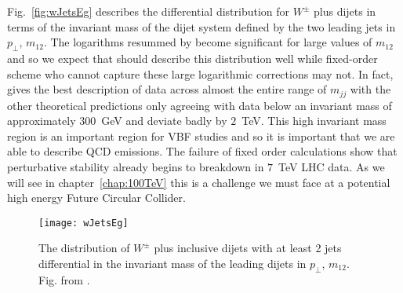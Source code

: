 		Fig.~\eqref{fig:wJetsEg} describes the differential distribution for $W^\pm$ plus dijets in terms of the
		invariant mass of the dijet system defined by the two leading jets in $p_\perp$, $m_{12}$.  The logarithms
		resummed by \hej become significant for large values of $m_{12}$ and so we expect that \HEJ should
		describe this distribution well while fixed-order scheme who cannot capture these large logarithmic
		corrections may not. In fact, \HEJ gives the best description of data across almost the entire range of $m_{jj}$
		with the other theoretical predictions only agreeing with data below an invariant mass of approximately $300$~GeV
		and deviate badly by $2$~TeV.  This high invariant mass region is an important region for VBF studies and so it
		is important that we are able to describe QCD emissions.  The failure of fixed order calculations show that
		perturbative stability already begins to breakdown in $7$~TeV LHC data.  As we will see in chapter~\ref{chap:100TeV}
		this is a challenge we must face at a potential high energy Future Circular Collider.

		\begin{figure}[hbt]
			\centering
			\texttt{[image: wJetsEg]}
			\caption{The distribution of $W^\pm$ plus inclusive dijets with at least
			2 jets differential in the invariant mass of the leading dijets in $p_\perp$, $m_{12}$.
			Fig. from \cite{Aad:2014qxa}.}
			\label{fig:wJetsEg}
		\end{figure}

